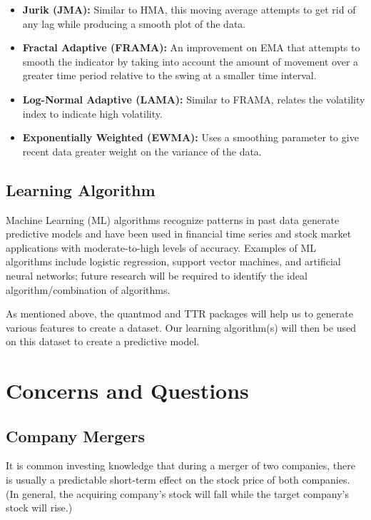 \documentclass[11pt]{article}
\begin{document}
\begin{itemize}
\begin{itemize}
		\item \textbf{Jurik (JMA):} Similar to HMA, this moving average attempts to get rid of any lag while producing a smooth plot of the data.
		\item \textbf{Fractal Adaptive (FRAMA):} An improvement on EMA that attempts to smooth the indicator by taking into account the amount of movement over a greater time period relative to the swing at a smaller time interval.
		\item \textbf{Log-Normal Adaptive (LAMA):} Similar to FRAMA, relates the volatility index to indicate high volatility.
		\item \textbf{Exponentially Weighted (EWMA):} Uses a smoothing parameter to give recent data greater weight on the variance of the data.
	\end{itemize}
\end{itemize}

\subsection*{Learning Algorithm}\label{FP}
Machine Learning (ML) algorithms recognize patterns in past data generate predictive models and have been used in financial time series and stock market applications with moderate-to-high levels of accuracy.\textsuperscript{\cite{JSZ}\cite{MZ}\cite{ANHS}\cite{KK}\cite{BRS}} Examples of ML algorithms include logistic regression, support vector machines, and artificial neural networks; future research will be required to identify the ideal algorithm/combination of algorithms.

As mentioned above, the quantmod and TTR packages will help us to generate various features to create a dataset. Our learning algorithm(s) will then be used on this dataset to create a predictive model. 

\section*{\hspace{-.5cm} Concerns and Questions}\label{CQ}
\subsection*{Company Mergers}\label{CMerg}
It is common investing knowledge that during a merger of two companies, there is usually a predictable short-term effect on the stock price of both companies. (In general, the acquiring company's stock will fall while the target company's stock will rise.)\textsuperscript{\cite{INV}}
\end{document}
